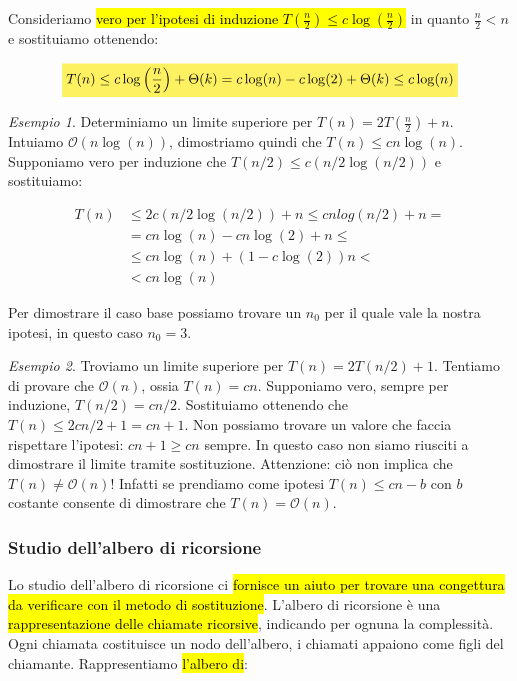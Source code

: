 \documentclass[a4paper,11pt,twoside]{article}
\theoremstyle{plain}
\theoremstyle{definition}
\theoremstyle{remark}
\newtheorem{esempio}{Esempio}[section]
\newcommand{\mhl}[1]{\colorbox{hlcolor}{$\displaystyle #1$}}
\begin{document}
Consideriamo \hl{vero per l'ipotesi di induzione $T(\frac{n}{2}) \leq
c\log(\frac{n}{2})$} in quanto $\frac{n}{2} < n$ e sostituiamo ottenendo:

\begin{equation}
  \mhl{
    T(n) \leq c\log\left(\frac{n}{2}\right) + \Theta(k) = c\log(n) - c\log(2) +
      \Theta(k) \leq c\log(n)
  }
\end{equation}

\begin{esempio}
  Determiniamo un limite superiore per $T(n) = 2T(\frac{n}{2})+n$. Intuiamo
  $\mathcal{O}(n\log(n))$, dimostriamo quindi che $T(n) \leq cn\log(n)$.
  Supponiamo vero per induzione che $T(n/2) \leq c(n/2\log(n/2))$ e sostituiamo:

  \begin{align*}
    T(n) & \leq 2c(n/2\log(n/2)) + n \leq cnlog(n/2)+n = \\
      & = cn\log(n) - cn\log(2) + n \leq \\
      & \leq cn\log(n) + (1-c\log(2))n < \\
      & < cn\log(n)
  \end{align*}

  Per dimostrare il caso base possiamo trovare un $n_0$ per il quale vale la
  nostra ipotesi, in questo caso $n_0 = 3$.
\end{esempio}
\begin{esempio}
  Troviamo un limite superiore per $T(n) = 2T(n/2) + 1$. Tentiamo di provare che
  $\mathcal{O}(n)$, ossia $T(n) = cn$. Supponiamo vero, sempre per induzione,
  $T(n/2) = cn/2$. Sostituiamo ottenendo che $T(n) \leq 2cn/2 + 1 = cn+1$. Non
  possiamo trovare un valore che faccia rispettare l'ipotesi: $cn+1 \geq cn$
  sempre. In questo caso non siamo riusciti a dimostrare il limite tramite
  sostituzione. Attenzione: ciò non implica che $T(n) \neq \mathcal{O}(n)$!
  Infatti se prendiamo come ipotesi $T(n) \leq cn-b$ con $b$ costante consente
  di dimostrare che $T(n) = \mathcal{O}(n)$.
\end{esempio}

\subsubsection{Studio dell'albero di ricorsione}\label{sec:alg-ricorsivi-albero}

Lo studio dell'albero di ricorsione ci \hl{fornisce un aiuto per trovare una
congettura da verificare con il metodo di sostituzione}. L'albero di ricorsione è
una \hl{rappresentazione delle chiamate ricorsive}, indicando per ognuna la
complessità. Ogni chiamata costituisce un nodo dell'albero, i chiamati appaiono
come figli del chiamante. Rappresentiamo \hl{l'albero di}:
\end{document}
